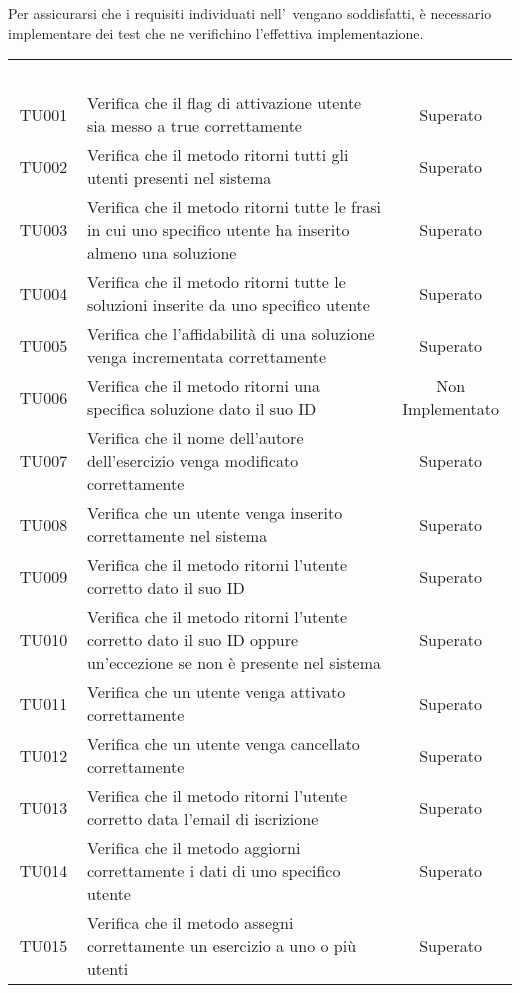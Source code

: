 Per assicurarsi che i requisiti individuati nell'\AdR \ vengano soddisfatti, è necessario implementare dei test che ne verifichino l'effettiva implementazione.

\begin{tabularx}{\textwidth}{cXc}
	
	\rowcolor{greySWEight}
	
		\rowcolor{greySWEight}
		\textcolor{white}{\textbf{Codice}} & 
		\textcolor{white}{\textbf{Descrizione}} &
		\textcolor{white}{\textbf{Stato}} \\
		
		TU001 & Verifica che il flag di attivazione utente sia messo a true correttamente & Superato \\
		TU002 & Verifica che il metodo ritorni tutti gli utenti presenti nel sistema & Superato \\
		TU003 & Verifica che il metodo ritorni tutte le frasi in cui uno specifico utente ha inserito almeno una soluzione & Superato \\
		TU004 & Verifica che il metodo ritorni tutte le soluzioni inserite da uno specifico utente & Superato \\
		TU005 & Verifica che l'affidabilità di una soluzione venga incrementata correttamente & Superato \\
		TU006 & Verifica che il metodo ritorni una specifica soluzione dato il suo ID & Non Implementato \\
		TU007 & Verifica che il nome dell'autore dell'esercizio venga modificato correttamente & Superato \\
		TU008 & Verifica che un utente venga inserito correttamente nel sistema & Superato \\
		TU009 & Verifica che il metodo ritorni l'utente corretto dato il suo ID & Superato \\
		TU010 & Verifica che il metodo ritorni l'utente corretto dato il suo ID oppure un'eccezione se non è presente nel sistema & Superato \\
		TU011 & Verifica che un utente venga attivato correttamente & Superato \\
		TU012 & Verifica che un utente venga cancellato correttamente & Superato \\
		TU013 & Verifica che il metodo ritorni l'utente corretto data l'email di iscrizione & Superato \\
		TU014 & Verifica che il metodo aggiorni correttamente i dati di uno specifico utente & Superato \\
		TU015 & Verifica che il metodo assegni correttamente un esercizio a uno o più utenti & Superato \\

\end{tabularx}
